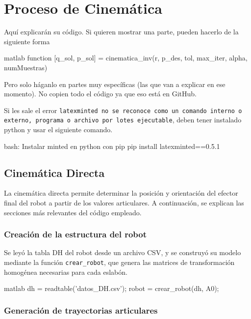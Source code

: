 \section{Proceso de Cinemática} \label{sec:proceso_cinematica}

Aquí explicarán su código. Si quieren mostrar una parte, pueden hacerlo de la siguiente forma

\begin{matlabcode}{matlab}
	function [q_sol, p_sol] = cinematica_inv(r, p_des, tol, max_iter, alpha, numMuestras)
\end{matlabcode}

Pero solo háganlo en partes muy específicas (las que van a explicar en ese momento). No copien todo el código ya que eso está en GitHub.

Si les sale el error \texttt{latexminted no se reconoce como un comando interno o externo, programa o archivo por lotes ejecutable}, deben tener instalado python y usar el siguiente comando.
\begin{terminal}{bash: Instalar minted en python con pip}
	pip install latexminted==0.5.1
\end{terminal}

\subsection{Cinemática Directa}

La cinemática directa permite determinar la posición y orientación del efector final del robot a partir de los valores articulares. A continuación, se explican las secciones más relevantes del código empleado.

\subsubsection*{Creación de la estructura del robot}

Se leyó la tabla DH del robot desde un archivo CSV, y se construyó su modelo mediante la función \texttt{crear\_robot}, que genera las matrices de transformación homogénea necesarias para cada eslabón.

\begin{matlabcode}{matlab}
	dh = readtable('datos\tabla_DH\robotnuestro.csv');
	robot = crear_robot(dh, A0);
\end{matlabcode}

\subsubsection*{Generación de trayectorias articulares}

